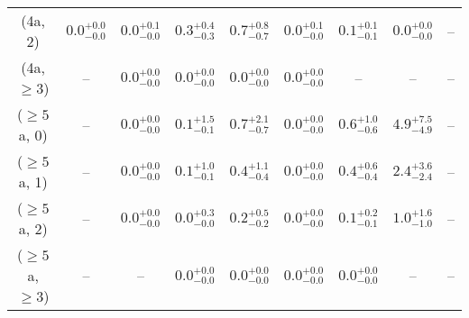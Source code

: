 \begin{table}[h!]
{\begin{tabular}{ccccccccc}
	(4a, 2) & $0.0^{+ 0.0 }_{- 0.0 }$ & $0.0^{+ 0.1 }_{- 0.0 }$ & $0.3^{+ 0.4 }_{- 0.3 }$ & $0.7^{+ 0.8 }_{- 0.7 }$ & $0.0^{+ 0.1 }_{- 0.0 }$ & $0.1^{+ 0.1 }_{- 0.1 }$ & $0.0^{+ 0.0 }_{- 0.0 }$ & -- \\[0.5ex] 
	(4a, $\ge3$) & -- & $0.0^{+ 0.0 }_{- 0.0 }$ & $0.0^{+ 0.0 }_{- 0.0 }$ & $0.0^{+ 0.0 }_{- 0.0 }$ & $0.0^{+ 0.0 }_{- 0.0 }$ & -- & -- & -- \\[0.5ex] 
	($\ge5$a, 0) & -- & $0.0^{+ 0.0 }_{- 0.0 }$ & $0.1^{+ 1.5 }_{- 0.1 }$ & $0.7^{+ 2.1 }_{- 0.7 }$ & $0.0^{+ 0.0 }_{- 0.0 }$ & $0.6^{+ 1.0 }_{- 0.6 }$ & $4.9^{+ 7.5 }_{- 4.9 }$ & -- \\[0.5ex] 
	($\ge5$a, 1) & -- & $0.0^{+ 0.0 }_{- 0.0 }$ & $0.1^{+ 1.0 }_{- 0.1 }$ & $0.4^{+ 1.1 }_{- 0.4 }$ & $0.0^{+ 0.0 }_{- 0.0 }$ & $0.4^{+ 0.6 }_{- 0.4 }$ & $2.4^{+ 3.6 }_{- 2.4 }$ & -- \\[0.5ex] 
	($\ge5$a, 2) & -- & $0.0^{+ 0.0 }_{- 0.0 }$ & $0.0^{+ 0.3 }_{- 0.0 }$ & $0.2^{+ 0.5 }_{- 0.2 }$ & $0.0^{+ 0.0 }_{- 0.0 }$ & $0.1^{+ 0.2 }_{- 0.1 }$ & $1.0^{+ 1.6 }_{- 1.0 }$ & -- \\[0.5ex] 
	($\ge5$a, $\ge3$) & -- & -- & $0.0^{+ 0.0 }_{- 0.0 }$ & $0.0^{+ 0.0 }_{- 0.0 }$ & $0.0^{+ 0.0 }_{- 0.0 }$ & $0.0^{+ 0.0 }_{- 0.0 }$ & -- & -- \\[0.5ex] 
	\hline
	\hline
\end{tabular}}
\end{table}

